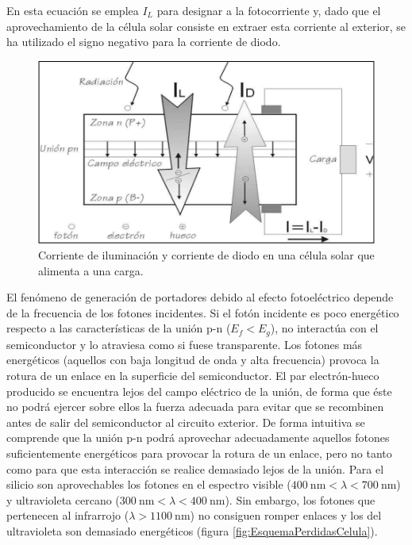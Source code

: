 En esta ecuación se emplea $I_{L}$ para designar a la fotocorriente
y, dado que el aprovechamiento de la célula solar consiste en extraer
esta corriente al exterior, se ha utilizado el signo negativo para
la corriente de diodo.


\begin{figure}
\begin{centering}
\includegraphics[scale=0.7]{../figs/CelulaSolar}
\end{centering}

\caption{Corriente de iluminación y corriente de diodo en una célula solar
que alimenta a una carga.\label{fig:EsquemaCorrientesCelula}}

\end{figure}


El fenómeno de generación de portadores debido al efecto fotoeléctrico
depende de la frecuencia de los fotones incidentes. Si el fotón incidente
es poco energético respecto a las características de la unión p-n
($E_{f}<E_{g}$), no interactúa con el semiconductor y lo atraviesa
como si fuese transparente. Los fotones más energéticos (aquellos
con baja longitud de onda y alta frecuencia) provoca la rotura de
un enlace en la superficie del semiconductor. El par electrón-hueco
producido se encuentra lejos del campo eléctrico de la unión, de forma
que éste no podrá ejercer sobre ellos la fuerza adecuada para evitar
que se recombinen antes de salir del semiconductor al circuito exterior.
De forma intuitiva se comprende que la unión p-n podrá aprovechar
adecuadamente aquellos fotones suficientemente energéticos para provocar
la rotura de un enlace, pero no tanto como para que esta interacción
se realice demasiado lejos de la unión. Para el silicio son aprovechables
los fotones en el espectro visible ($\SI{400}{\nano\meter}<\lambda<\SI{700}{\nano\meter}$)
y ultravioleta cercano ($\SI{300}{\nano\meter}<\lambda<\SI{400}{\nano\meter}$).
Sin embargo, los fotones que pertenecen al infrarrojo ($\lambda>\SI{1100}{\nano\meter}$)
no consiguen romper enlaces y los del ultravioleta son demasiado energéticos
(figura \ref{fig:EsquemaPerdidasCelula}).


